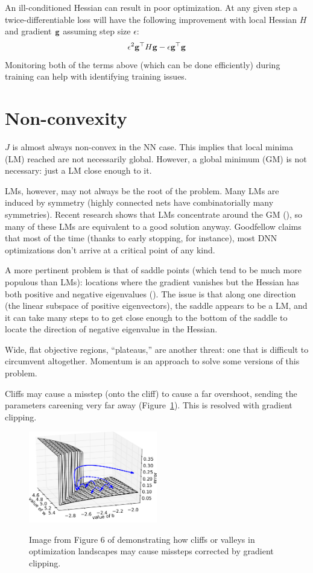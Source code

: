 \documentclass{article}
\begin{document}
An ill-conditioned Hessian can result in poor optimization. At any given step a twice-differentiable loss will have the following improvement with local Hessian $H$ and gradient $\textbf{g}$ assuming step size $\epsilon$:
$$
\epsilon^2 \textbf{g}^\top H\textbf{g}-\epsilon \textbf{g}^\top\textbf{g}
$$
Monitoring both of the terms above (which can be done efficiently) during training can help with identifying training issues.

\section{Non-convexity}

$J$ is almost always non-convex in the NN case. This implies that local minima (LM) reached are not necessarily global. However, a global minimum (GM) is not necessary: just a LM close enough to it.

LMs, however, may not always be the root of the problem. Many LMs are induced by symmetry (highly connected nets have combinatorially many symmetries). Recent research shows that LMs concentrate around the GM (), so many of these LMs are equivalent to a good solution anyway. Goodfellow claims that most of the time (thanks to early stopping, for instance), most DNN optimizations don't arrive at a critical point of any kind.

A more pertinent problem is that of saddle points (which tend to be much more populous than LMs): locations where the gradient vanishes but the Hessian has both positive and negative eigenvalues (). The issue is that along one direction (the linear subspace of positive eigenvectors), the saddle appears to be a LM, and it can take many steps to to get close enough to the bottom of the saddle to locate the direction of negative eigenvalue in the Hessian.

Wide, flat objective regions, ``plateaus,'' are another threat: one that is difficult to circumvent altogether. Momentum is an approach to solve some versions of this problem.

Cliffs may cause a misstep (onto the cliff) to cause a far overshoot, sending the parameters careening very far away (Figure~\ref{fig:pascanu}). This is resolved with gradient clipping.

\begin{figure}[!h]
\centering
{\includegraphics[width=0.5\textwidth]{pascanu2013.png}}
  \caption{Image from Figure 6 of  demonstrating how cliffs or valleys in optimization landscapes may cause missteps corrected by gradient clipping.}
\label{fig:pascanu}
\end{figure}
\end{document}
